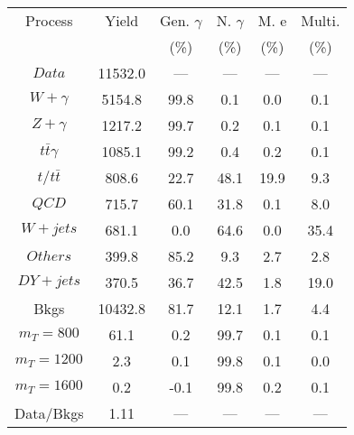 \begin{figure}
\begin{minipage}[c]{0.32\textwidth}
\tiny{
\begin{tabular}{cccccc}
\hline
Process & Yield & Gen. $\gamma$ & N. $\gamma$ & M. e & Multi. \\
 &  & (\%) & (\%) & (\%) & (\%)  \\
\hline
                                                                      $ Data $ &  11532.0 &  --- &  --- &  --- &  ---\\
$ W+\gamma $ &  5154.8 &  99.8 &  0.1 &  0.0 &  0.1\\
$ Z+\gamma $ &  1217.2 &  99.7 &  0.2 &  0.1 &  0.1\\
$ t\bar{t}\gamma $ &  1085.1 &  99.2 &  0.4 &  0.2 &  0.1\\
$ t/t\bar{t} $ &  808.6 &  22.7 &  48.1 &  19.9 &  9.3\\
$ QCD $ &  715.7 &  60.1 &  31.8 &  0.1 &  8.0\\
$ W+jets $ &  681.1 &  0.0 &  64.6 &  0.0 &  35.4\\
$ Others $ &  399.8 &  85.2 &  9.3 &  2.7 &  2.8\\
$ DY+jets $ &  370.5 &  36.7 &  42.5 &  1.8 &  19.0\\
Bkgs &  10432.8 &  81.7 &  12.1 &  1.7 &  4.4\\
$ m_{T} = 800 $ &  61.1 &  0.2 &  99.7 &  0.1 &  0.1\\
$ m_{T} = 1200 $ &  2.3 &  0.1 &  99.8 &  0.1 &  0.0\\
$ m_{T} = 1600 $ &  0.2 &  -0.1 &  99.8 &  0.2 &  0.1\\
Data/Bkgs &  1.11 &  --- &  --- &  --- &  ---\\
\hline
\end{tabular}
}
\end{minipage}
\end{figure}

